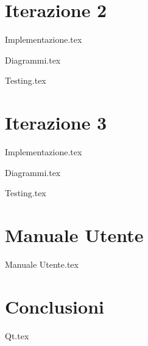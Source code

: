 \documentclass{report}
\begin{document}
	\clearpage
	
	
	
	\chapter{Iterazione 2}
	{Implementazione.tex}
	
	\clearpage
	
	{Diagrammi.tex}
	
	\clearpage
	
	{Testing.tex}
	
	\clearpage
	
	\chapter{Iterazione 3}
	{Implementazione.tex}
	
	\clearpage
	
	{Diagrammi.tex}
	
	\clearpage
	
	{Testing.tex}
		
	\clearpage
	\chapter{Manuale Utente}
	{Manuale Utente.tex}
	\clearpage
	\chapter{Conclusioni}
	{Qt.tex}
		
	
\end{document}
